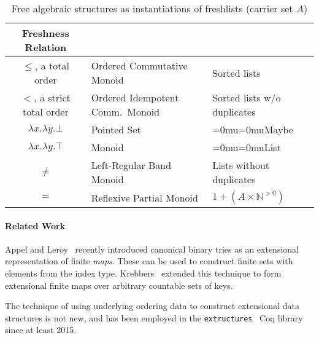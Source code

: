 \documentclass[a4paper]{easychair}
\newcommand{\AgdaFontStyle}[1]{\textsf{#1}}
\newcommand{\AgdaFormat}[2]{#2}
\newcommand{\AgdaNoSpaceMath}[1]
    {\begingroup\thickmuskip=0mu\medmuskip=0mu#1\endgroup}
\newcommand{\AgdaDatatype}[1]
    {\AgdaNoSpaceMath{\textcolor{AgdaDatatype}{\AgdaFontStyle{\AgdaFormat{#1}{{#1}}}}}}
\begin{document}
\begin{table}[bh]\centering
  \begin{tabular}{  |c|m{16em}|m{12em}| }
    \hline
    Freshness Relation & \centering{Free Algebraic Structure} & \centering{Data Structure} \tabularnewline
                                                                \hline
                                                                $\leq$, a total order & Ordered Commutative Monoid & Sorted lists \\
    $<$, a strict total order & Ordered Idempotent Comm.\ Monoid & Sorted lists w/o duplicates \\
    $\lambda x. \lambda y. \bot$ & Pointed Set & \AgdaDatatype{Maybe} \\
    $\lambda x. \lambda y. \top$ & Monoid & \AgdaDatatype{List} \\
    $\neq$ & Left-Regular Band Monoid & Lists without duplicates \\
    $=$ & Reflexive Partial Monoid & $1 + (A \times \mathbb{N}^{>0})$ \\
    \hline
  \end{tabular}
  \caption{Free algebraic structures as instantiations of freshlists (carrier set $A$)}
  \label{tab:other-results}
\end{table}

\paragraph{Related Work}
Appel and Leroy~\cite{appelleroy2023tries} recently introduced canonical binary tries as an extensional representation of finite \emph{maps}.
These can be used to construct finite sets with elements from the index type.
Krebbers~\cite{krebbers2023extensionalmaps} extended this technique to form extensional finite maps over arbitrary countable sets of keys.

The technique of using underlying ordering data to construct extensional data structures is not new, and has been employed in the \texttt{extructures}~\cite{coqextructures} Coq library since at least 2015.






%
%
%


\end{document}
